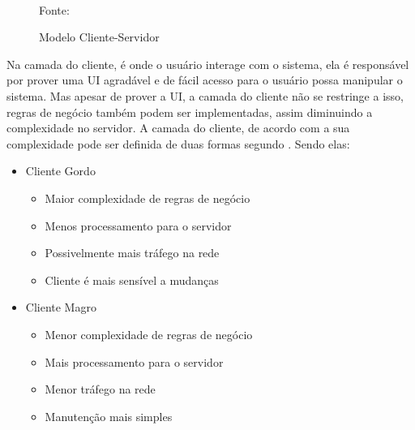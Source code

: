 \begin{figure}[h!]
\centering
\caption{Modelo Cliente-Servidor}
\\
Fonte: \cite{devmediaMultiCamadaP12018}
\label{f_c2_cliente_servidor}
\end{figure}

Na camada do cliente, é onde o usuário interage com o sistema, ela é responsável por prover uma \ac{UI} agradável e de fácil acesso para o usuário possa manipular o sistema. Mas apesar de prover a \ac{UI}, a camada do cliente não se restringe a isso, regras de negócio também podem ser implementadas, assim diminuindo a complexidade no servidor. A camada do cliente, de acordo com a sua  complexidade pode ser definida de duas formas segundo \cite{devmediaMultiCamadaP12018}. Sendo elas:

\begin{itemize}
    \item Cliente Gordo
    \begin{itemize}
        \item Maior complexidade de regras de negócio
        \item Menos processamento para o servidor
        \item Possivelmente mais tráfego na rede
        \item Cliente é mais sensível a mudanças
    \end{itemize}
    \item Cliente Magro
    \begin{itemize}
        \item Menor complexidade de regras de negócio
        \item Mais processamento para o servidor
        \item Menor tráfego na rede
        \item Manutenção mais simples
    \end{itemize}
\end{itemize}

